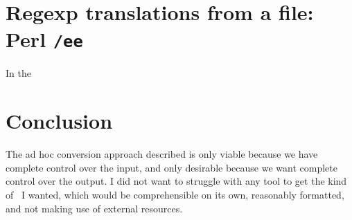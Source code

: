 \documentclass[final]{ltugboat}
\def\code#1{{\tt #1}}
\begin{document}
\section{Regexp translations from a file: Perl \code{/ee}}

In the 

\section{Conclusion}

The ad hoc conversion approach described is only viable because we have
complete control over the input, and only desirable because we want
complete control over the output. I did not want to struggle with any
tool to get the kind of \HTML\ I wanted, which would be comprehensible
on its own, reasonably formatted, and not making use of external
resources.





\makesignature
\end{document}
